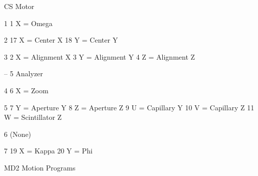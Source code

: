 \begin{DoxyPre}
  CS       Motor\end{DoxyPre}



\begin{DoxyPre}  1             1       X = Omega\end{DoxyPre}



\begin{DoxyPre}  2             17      X = Center X
                18      Y = Center Y\end{DoxyPre}



\begin{DoxyPre}  3             2       X = Alignment X
                3       Y = Alignment Y
                4       Z = Alignment Z\end{DoxyPre}



\begin{DoxyPre}  --            5       Analyzer\end{DoxyPre}



\begin{DoxyPre}  4             6       X = Zoom\end{DoxyPre}



\begin{DoxyPre}  5             7       Y = Aperture Y
                8       Z = Aperture Z
                9       U = Capillary Y
               10       V = Capillary Z
               11       W = Scintillator Z\end{DoxyPre}



\begin{DoxyPre}  6                     (None)\end{DoxyPre}



\begin{DoxyPre}  7            19       X = Kappa
               20       Y = Phi\end{DoxyPre}



\begin{DoxyPre}\end{DoxyPre}


M\-D2 Motion Programs


\begin{DoxyPre}\end{DoxyPre}



